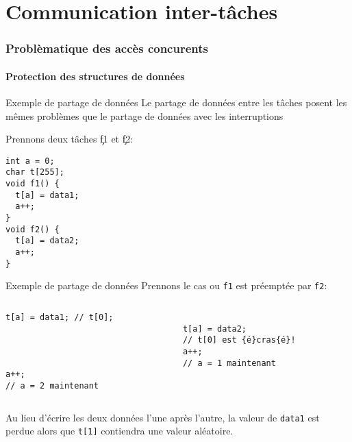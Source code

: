 %
%
%

\part{Communication inter-tâches}

\section{Problèmatique des accès concurents}

\subsection{Protection des structures de données}

\begin{frame}[fragile]{Exemple de partage de données}
  Le partage de données entre les tâches posent les mêmes problèmes que
  le partage de données avec les interruptions

  Prennons deux tâches \c{f1} et \c{f2}:
  \begin{lstlisting}
int a = 0;
char t[255];
void f1() {
  t[a] = data1;
  a++;
}
void f2() {
  t[a] = data2;
  a++;
}
       \end{lstlisting}
\end{frame}

\begin{frame}[fragile]{Exemple de partage de données}
Prennons le cas ou \verb+f1+ est préemptée par \verb+f2+:
  \begin{columns}
    \begin{column}{5cm}
      \begin{lstlisting}[showlines=true,emptylines=10]
t[a] = data1; // t[0];




a++;
// a = 2 maintenant
       \end{lstlisting}
     \end{column}
     \begin{column}{5cm}
      \begin{lstlisting}[showlines=true,emptylines=10,escapeinside=\{\}]

t[a] = data2;
// t[0] est {é}cras{é}!
a++;
// a = 1 maintenant


       \end{lstlisting}
    \end{column}
  \end{columns}

  Au lieu d'écrire  les deux données l'une après  l'autre, la valeur de
  \verb+data1+ est perdue alors  que \verb+t[1]+ contiendra une valeur
  aléatoire.
\end{frame}

